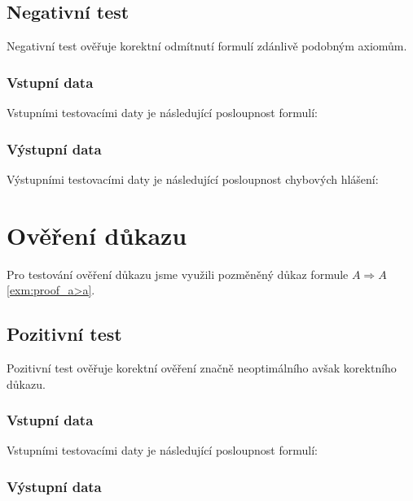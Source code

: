 \documentclass[thesis=B,czech,hidelinks]{thesis}[2012/06/26]
\begin{document}


\subsection{Negativní test}

Negativní test ověřuje korektní odmítnutí formulí zdánlivě podobným axiomům.

\subsubsection{Vstupní data}

Vstupními testovacími daty je následující posloupnost formulí:



\subsubsection{Výstupní data}

Výstupními testovacími daty je následující posloupnost chybových hlášení:



\section{Ověření důkazu}

Pro testování ověření důkazu jsme využili pozměněný důkaz formule $A \Rightarrow A$ \ref{exm:proof_a>a}.

\subsection{Pozitivní test}

Pozitivní test ověřuje korektní ověření značně neoptimálního avšak korektního důkazu.

\subsubsection{Vstupní data}

Vstupními testovacími daty je následující posloupnost formulí:



\subsubsection{Výstupní data}
\end{document}
